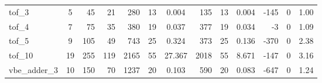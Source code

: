 \begin{table}[H]
\begin{tabular}{l|c rr|rr S[table-format=5.3]|rr S[table-format=5.3]|rr S[table-format=2.2]}
tof\_3               & 5  & 45   & 21   & 280   & 13  & 0.004    & 135   & 13  & 0.004    & -145   & 0    & 1.00  \\
tof\_4               & 7  & 75   & 35   & 380   & 19  & 0.037    & 377   & 19  & 0.034    & -3     & 0    & 1.09  \\
tof\_5               & 9  & 105  & 49   & 743   & 25  & 0.324    & 373   & 25  & 0.136    & -370   & 0    & 2.38  \\
tof\_10              & 19 & 255  & 119  & 2165  & 55  & 27.367   & 2018  & 55  & 8.671    & -147   & 0    & 3.16  \\
vbe\_adder\_3        & 10 & 150  & 70   & 1237  & 20  & 0.103    & 590   & 20  & 0.083    & -647   & 0    & 1.24  \\
\bottomrule
\end{tabular}
\end{table}

